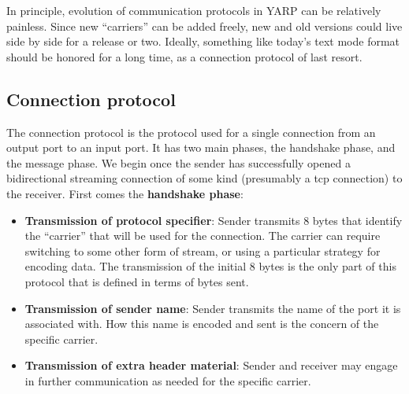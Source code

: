

In principle, evolution of communication protocols in YARP can be
relatively painless.  Since new ``carriers'' can be added freely,
new and old versions could live side by side
for a release or two.  Ideally,
something like today's text mode format should be honored for a long
time, as a connection protocol of last resort.



\subsection{Connection protocol}

The connection protocol 
is the protocol used for a single connection from an output port
to an input port. It has two main phases, the handshake phase,
and the message phase.
%
We begin once the sender has successfully opened a bidirectional
streaming connection of some kind (presumably a tcp
connection) to the receiver.
First comes the {\bf handshake phase}:

\begin{itemize} \pflist

\item {\bf Transmission of protocol specifier}:
Sender transmits 8 bytes that identify the ``carrier'' that will be
used for the connection.  The carrier can require switching to 
some other form of stream, or using a particular strategy for
encoding data.  The transmission of the initial 8 bytes is the
only part of this protocol that is defined in terms of bytes sent.

\item {\bf Transmission of sender name}: Sender transmits the name of
the port it is associated with.  How this name is encoded and sent is
the concern of the specific carrier.

\item {\bf Transmission of extra header material}: Sender and
receiver may engage in further communication as needed for the
specific carrier.  

\end{itemize}

